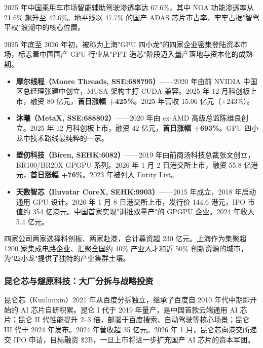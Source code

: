 2025 年中国乘用车市场智能辅助驾驶渗透率达 67.6\%，其中 NOA 功能渗透率从 21.6\% 飙升至 42.6\%。地平线以 47.7\% 的国产 ADAS 芯片市占率，牢牢占据"智驾平权"浪潮中的核心位置。


\begin{keybox}
2025 年底至 2026 年初，被称为上海"GPU 四小龙"的四家企业密集登陆资本市场，标志着中国国产 GPU 行业从"PPT 造芯"阶段迈入量产落地与资本化的成熟期。

\begin{itemize}
  \item \textbf{摩尔线程（Moore Threads, SSE:688795）}——2020 年由前 NVIDIA 中国区总经理张建中创立，MUSA 架构主打 CUDA 兼容。2025 年 12 月科创板上市，融资 80 亿元，\textbf{首日涨幅 +425\%}。2025 年营收 15.06 亿元（+243\%）。
  \item \textbf{沐曦（MetaX, SSE:688802）}——2020 年由 ex-AMD 高级总监陈维良创立。2025 年 12 月科创板上市，融资 42 亿元，\textbf{首日涨幅 +693\%}。GPU 四小龙中技术路线最纯粹的一家。
  \item \textbf{壁仞科技（Biren, SEHK:6082）}——2019 年由前商汤科技总裁张文创立，BR100/BR20X GPGPU 系列。2026 年 1 月 2 日港交所上市，融资 55.8 亿港元，\textbf{首日涨幅 +76\%}。2023 年被列入 Entity List。
  \item \textbf{天数智芯（Iluvatar CoreX, SEHK:9903）}——2015 年成立，2018 年启动通用 GPU 设计。2026 年 1 月 8 日港交所上市，发行价 144.6 港元，IPO 市值约 354 亿港元。中国首家实现"训推双量产"的 GPGPU 企业。2024 年收入 5.4 亿元。
\end{itemize}

四家公司两家选择科创板、两家赴港，合计募资超 230 亿元。上海作为集聚超 1200 家集成电路企业、汇聚全国约 40\% 产业人才和近 50\% 创新资源的城市，为"四小龙"提供了独特的产业集群土壤。
\end{keybox}

\subsubsection{昆仑芯与燧原科技：大厂分拆与战略投资}

昆仑芯（Kunlunxin）2021 年从百度分拆独立，继承了百度自 2010 年代中期即开始的 AI 芯片自研积累。昆仑 I 代于 2019 年量产，是中国首款云端通用 AI 芯片；昆仑 II 代性能提升 2--3 倍，部署于百度搜索、自动驾驶等核心场景；昆仑 III 代于 2024 年发布。2024 年营收超 35 亿元。2026 年 1 月，昆仑芯向港交所递交 IPO 申请，目标融资 \$2B，一旦上市将进一步扩充国产 AI 芯片的资本军团。

